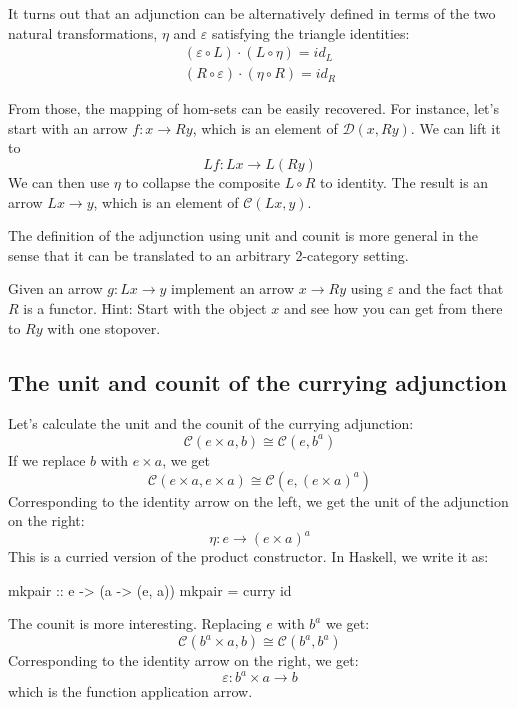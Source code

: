 \documentclass[DaoFP]{subfiles}
\begin{document}
It turns out that an adjunction can be alternatively defined in terms of the two natural transformations, $\eta$ and $\varepsilon$ satisfying the  triangle identities:
\begin{align*}
(\varepsilon \circ L) \cdot (L \circ \eta) = id_L \\
(R \circ \varepsilon) \cdot (\eta \circ R) = id_R
\end{align*}

From those, the mapping of hom-sets can be easily recovered. For instance, let's start with an arrow $f \colon x \to R y$, which is an element of $\mathcal{D}( x , R y)$. We can lift it to 
\[L f \colon L x \to L (R y)\]
We can then use $\eta$ to collapse the composite $L \circ R$ to identity. The result is an arrow $L x \to y$, which is an element of $ \mathcal{C} (L x, y)$.


The definition of the adjunction using unit and counit is more general in the sense that it can be translated to an arbitrary 2-category setting. 

\begin{exercise}
Given an arrow $g \colon L x \to y$ implement an arrow $x \to R y$ using $\varepsilon$ and the fact that $R$ is a functor. Hint: Start with the object $x$ and see how you can get from there to $R y$ with one stopover.
\end{exercise}

\subsection{The unit and counit of the currying adjunction}

Let's calculate the unit and the counit of the currying adjunction:
\[  \mathcal{C}(e \times a, b ) \cong  \mathcal{C} (e, b^a)  \]
If we replace $b$ with $e \times a$, we get
\[  \mathcal{C}(e \times a, e \times a ) \cong  \mathcal{C} (e, (e \times a)^a)  \]
Corresponding to the identity arrow on the left, we get the unit of the adjunction on the right:
\[ \eta \colon e \to (e \times a)^a \]
This is a curried version of the product constructor. In Haskell, we write it as:
\begin{haskell}
mkpair :: e -> (a -> (e, a))
mkpair = curry id
\end{haskell}

The counit is more interesting. Replacing $e$ with $b^a$ we get:
\[  \mathcal{C}(b^a \times a, b ) \cong  \mathcal{C} (b^a, b^a)  \]
Corresponding to the identity arrow on the right, we get:
\[ \varepsilon \colon b^a \times a \to b \]
which is the function application arrow. 
\end{document}
